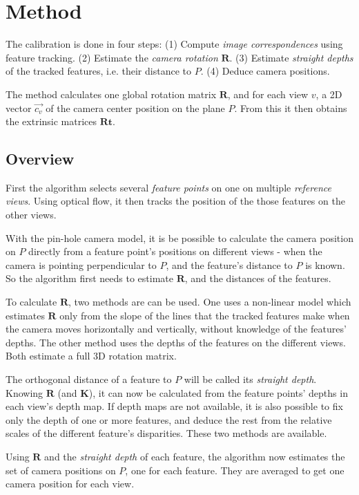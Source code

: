 \documentclass[11pt]{scrreprt}
\newcommand{\matr}[1]{\mathbf{#1}}
\begin{document}
\chapter{Method}
The calibration is done in four steps: (1) Compute \emph{image correspondences} using feature tracking. (2) Estimate the \emph{camera rotation} $\matr{R}$. (3) Estimate \emph{straight depths} of the tracked features, i.e. their distance to $P$. (4) Deduce camera positions.

The method calculates one global rotation matrix $\matr{R}$, and for each view $v$, a 2D vector $\vec{c_v}$ of the camera center position on the plane $P$. From this it then obtains the extrinsic matrices $\matr{Rt}$.

\section{Overview}
First the algorithm selects several \emph{feature points} on one on multiple \emph{reference views}. Using optical flow, it then tracks the position of the those features on the other views.

With the pin-hole camera model, it is be possible to calculate the camera position on $P$ directly from a feature point's positions on different views - when the camera is pointing perpendicular to $P$, and the feature's distance to $P$ is known. So the algorithm first needs to estimate $\matr{R}$, and the distances of the features.

To calculate $\matr{R}$, two methods are can be used. One uses a non-linear model which estimates $\matr{R}$ only from the slope of the lines that the tracked features make when the camera moves horizontally and vertically, without knowledge of the features' depths. The other method uses the depths of the features on the different views. Both estimate a full 3D rotation matrix.

The orthogonal distance of a feature to $P$ will be called its \emph{straight depth}. Knowing $\matr{R}$ (and $\matr{K}$), it can now be calculated from the feature points' depths in each view's depth map. If depth maps are not available, it is also possible to fix only the depth of one or more features, and deduce the rest from the relative scales of the different feature's disparities. These two methods are available.

Using $\matr{R}$ and the \emph{straight depth} of each feature, the algorithm now estimates the set of camera positions on $P$, one for each feature. They are averaged to get one camera position for each view.
\end{document}
